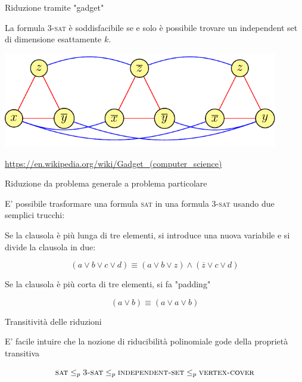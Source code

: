 \begin{frame}{Riduzione tramite "gadget"}

La formula \textsc{3-sat} è soddisfacibile se e solo è possibile trovare un
independent set di dimensione esattamente $k$.

\bigskip
\begin{center}
\includegraphics[width=0.9\textwidth,page=2]{gadget.pdf}
\end{center}

\small
\url{https://en.wikipedia.org/wiki/Gadget\_(computer\_science)}

\end{frame}

\begin{frame}{Riduzione da problema generale a problema particolare}


\bigskip
{}

\pause
\smallskip
E' possibile trasformare una formula \textsc{sat} in una formula \textsc{3-sat} usando due semplici trucchi:
\BIL
\item Se la clausola è più lunga di tre elementi, si introduce una nuova variabile e si divide la clausola in due:

\[
  (a \vee b \vee c \vee d) \equiv (a \vee b \vee z) \wedge (\overline{z} \vee c \vee d)
\]
\item Se la clausola è più corta di tre elementi, si fa "padding"

\[
  (a \vee b) \equiv (a \vee a \vee b)
\]
\EIL

\end{frame}

\begin{frame}{Transitività delle riduzioni}

E' facile intuire che la nozione di riducibilità polinomiale gode della
proprietà transitiva

\[
  \textsc{sat} \leq_p \textsc{3-sat} \leq_p \textsc{independent-set} \leq_p \textsc{vertex-cover}
\]

\end{frame}



